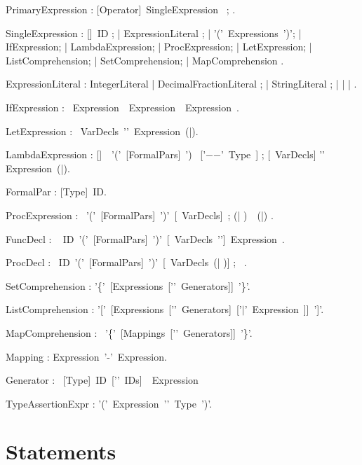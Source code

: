 PrimaryExpression : [Operator]~SingleExpression~ ;
      .

SingleExpression : [\kwOld]~ID ;
     | ExpressionLiteral ;
     | '('~Expressions~')';
     | IfExpression;
     | LambdaExpression;
     | ProcExpression;
     | LetExpression;
     | ListComprehension;
     | SetComprehension;
     | MapComprehension .

ExpressionLiteral : IntegerLiteral | DecimalFractionLiteral ;
       | StringLiteral ;
       | \kwTrue | \kwFalse | \kwNull.
\egr

\bgr 

  IfExpression : \kwIf~Expression~\kwThen~Expression~\kwElse~Expression~\kwEnd.

  LetExpression : \kwLet~VarDecls~'\charColon'~Expression~(\kwEnd|\kwEndLet).

LambdaExpression : [\kwConst]~\kwLambda~'('~[FormalPars]~') ~['$-$$-$\charMore'~Type~] ;
        [\kwVar ~VarDecls] '\charColon' Expression~(\kwEnd|\kwEndLambda).

FormalPar : [Type]~ID.

ProcExpression : \kwProc~'('~[FormalPars]~')'~[\kwVar~VarDecls]~;
      (\kwDo | \kwBegin)~~(\kwEnd|\kwEndProc) .

FuncDecl : \kwFunction~ ID~'('~[FormalPars]~')'~[\kwVar~VarDecls~'\charColon']~Expression~\kwEnd .

ProcDecl : \kwProcedure~ID~'('~[FormalPars]~')'~[\kwVar~VarDecls~(\kwBegin | \kwDo)] ;
     ~\kwEnd.

\egr

\bgr 

SetComprehension : '\{'~[Expressions~['\charColon'~Generators]]~'\}'.

ListComprehension : '['~[Expressions~['\charColon'~Generators]~['$\mid$'~Expression~]]~']'.

MapComprehension : \kwMap~'\{'~[Mappings~['\charColon'~Generators]]~'\}'.

Mapping : Expression~'-\charMore'~Expression.

Generator : \kwFor~[Type]~ID~['\charComma'~IDs]~\kwIn~Expression~

TypeAssertionExpr : '('~Expression~'\charColon\charColon'~Type~')'.

\egr

\section{Statements}

